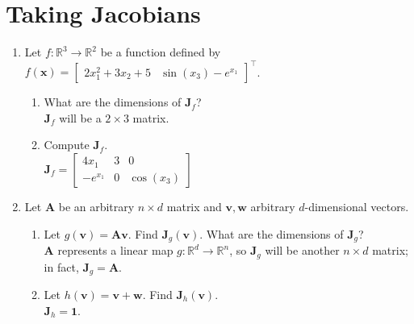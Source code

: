 \documentclass{article}
\begin{document}
\section{Taking Jacobians}
\begin{enumerate}[label=\arabic*.]
\item Let $f: \mathbb{R}^3 \rightarrow \mathbb{R}^2$ be a function defined by $f(\mathbf{x}) = \begin{bmatrix} 2x_1^2 + 3x_2 + 5 & \sin(x_3) - e^{x_1} \end{bmatrix}^\top$.
	\begin{enumerate}[label=(\alph*)]
	\item What are the dimensions of $\mathbf{J}_f$?\\
		{\color{blue}$\mathbf{J}_f$ will be a $2 \times 3$ matrix.}
	\item Compute $\mathbf{J}_f$.\\
		{\color{blue}$\mathbf{J}_f = \begin{bmatrix} 4x_1 & 3 & 0 \\ -e^{x_1} & 0 & \cos(x_3) \end{bmatrix}$}
	\end{enumerate}
\item Let $\mathbf{A}$ be an arbitrary $n\times d$ matrix and $\mathbf{v}, \mathbf{w}$ arbitrary $d$-dimensional vectors.
	\begin{enumerate}[label=(\alph*)]
	\item Let $g(\mathbf{v}) = \mathbf{Av}$. Find $\mathbf{J}_{g}(\mathbf{v})$. What are the dimensions of $\mathbf{J}_g$?\\
		{\color{blue}$\mathbf{A}$ represents a linear map $g: \mathbb{R}^d \rightarrow \mathbb{R}^n$, so $\mathbf{J}_g$ will be another $n\times d$ matrix; in fact, $\mathbf{J}_g = \mathbf{A}$.}
	\item Let $h(\mathbf{v}) = \mathbf{v + w}$. Find $\mathbf{J}_{h}(\mathbf{v})$.\\
		{\color{blue}$\mathbf{J}_h = \mathbf{1}$.}
	\end{enumerate}
\end{enumerate}
\end{document}

